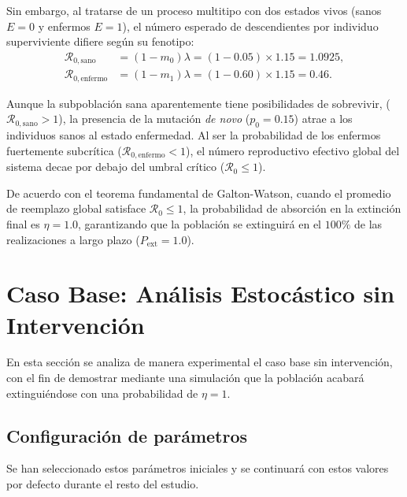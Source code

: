 \documentclass[graybox]{SNmult}
\begin{document}
	Sin embargo, al tratarse de un proceso multitipo con dos estados vivos (sanos $E=0$ y enfermos $E=1$), el número esperado de descendientes por individuo superviviente difiere según su fenotipo:
	\begin{align}
		\mathcal{R}_{0,\text{sano}} &= (1 - m_0)\lambda = (1 - 0.05) \times 1.15 = 1.0925, \\
		\mathcal{R}_{0,\text{enfermo}} &= (1 - m_1)\lambda = (1 - 0.60) \times 1.15 = 0.46.
	\end{align}
	
	Aunque la subpoblación sana aparentemente tiene posibilidades de sobrevivir, ($\mathcal{R}_{0,\text{sano}} > 1$), la presencia de la mutación \textit{de novo} ($p_0 = 0.15$) atrae a los individuos sanos al estado enfermedad. Al ser la probabilidad de los enfermos fuertemente subcrítica ($\mathcal{R}_{0,\text{enfermo}} < 1$), el número reproductivo efectivo global del sistema decae por debajo del umbral crítico ($\mathcal{R}_0 \le 1$). 

	
	De acuerdo con el teorema fundamental de Galton-Watson, cuando el promedio de reemplazo global satisface $\mathcal{R}_0 \le 1$, la probabilidad de absorción en la extinción final es $\eta = 1.0$, garantizando que la población se extinguirá en el $100\%$ de las realizaciones a largo plazo ($P_{\text{ext}} = 1.0$).
	
	 
	\section{Caso Base: Análisis Estocástico sin Intervención}
	\label{sec:caso_base}
	En esta sección se analiza de manera experimental el caso base sin intervención, con el fin de demostrar mediante una simulación que la población acabará extinguiéndose con una probabilidad de $\eta = 1$. 
	
	\subsection{Configuración de parámetros}
	Se han seleccionado estos parámetros iniciales y se continuará con estos valores por defecto durante el resto del estudio. 
	
\end{document}
